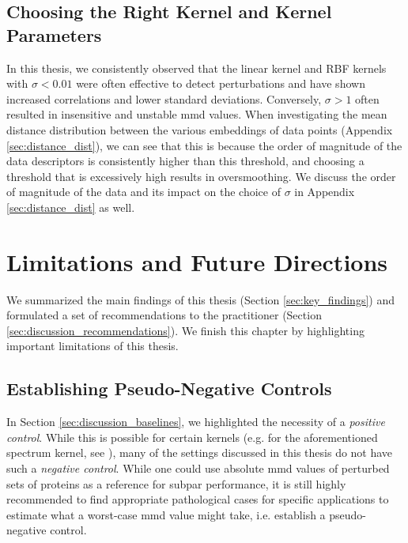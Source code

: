\subsection{Choosing the Right Kernel and Kernel Parameters}
In this thesis, we consistently observed that the linear kernel and RBF kernels
with $\sigma<0.01$ were often effective to detect perturbations and have shown
increased correlations and lower standard deviations. Conversely, $\sigma>1$
often resulted in insensitive and unstable \gls{mmd} values. When
investigating the mean distance distribution between the various embeddings of
data points (Appendix \ref{sec:distance_dist}), we can see that this is because
the order of magnitude of the data descriptors is consistently higher than this
threshold, and choosing a threshold that is excessively high results in
oversmoothing. We discuss the order of magnitude of the data and its impact on
the choice of $\sigma$ in Appendix \ref{sec:distance_dist} as well.

\section{Limitations and Future Directions}\label{sec:discussion_limitations}

We summarized the main findings of this thesis (Section \ref{sec:key_findings})
and formulated a set of recommendations to the practitioner (Section
\ref{sec:discussion_recommendations}). We finish this chapter by highlighting
important limitations of this thesis.


\subsection{Establishing Pseudo-Negative Controls}

In Section \ref{sec:discussion_baselines}, we highlighted the necessity of a
\emph{positive control}. While this is possible for certain kernels (e.g. for
the aforementioned spectrum kernel, see \cite{kucera2022conditional}), many of
the settings discussed in this thesis do not have such a \emph{negative control}.
While one could use absolute \gls{mmd} values of perturbed sets of proteins
as a reference for subpar performance, it is still highly recommended to find
appropriate pathological cases for specific applications to estimate what a
worst-case \gls{mmd} value might take, i.e. establish a pseudo-negative control.

